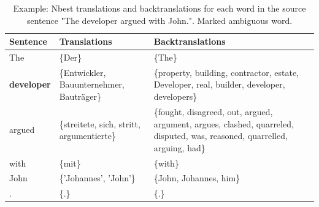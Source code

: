 \begin{table}[!htb]
    \centering
    \begin{tabularx}{\textwidth}{|l|X|X|}
        \hline
        \textbf{Sentence}  & \textbf{Translations} & \textbf{Backtranslations} \\ \hline
        The & \{Der\} & \{The\} \\ 
        \textbf{developer} & \{Entwickler, Bauunternehmer, Bauträger\} & \{property, building, contractor, estate, Developer, real, builder, developer, developers\} \\ 
        argued & \{streitete, sich, stritt, argumentierte\} & \{fought, disagreed, out, argued, argument, argues, clashed, quarreled, disputed, was, reasoned, quarrelled, arguing, had\} \\ 
        with & \{mit\} & \{with\} \\ 
        John & \{'Johannes', 'John'\} & \{John, Johannes, him\} \\ 
        . & \{.\} & \{.\} \\ \hline
    \end{tabularx}
    \caption{Example: Nbest translations and backtranslations for each word in the source sentence "The developer argued with John.". Marked ambiguous word.}
    \label{tab:alignment_example}
\end{table}

